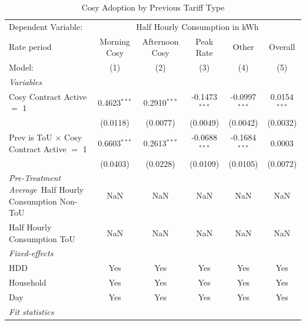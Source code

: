 
\begin{table}[htbp]
   \caption{\label{tab:prevrav} Cosy Adoption by Previous Tariff Type}
   \centering
   \begin{tabular}{lccccc}
      \tabularnewline \midrule \midrule
      Dependent Variable: & \multicolumn{5}{c}{Half Hourly Consumption in kWh}\\
      Rate period                                      & Morning Cosy   & Afternoon Cosy & Peak Rate       & Other           & Overall \\   
      Model:                                           & (1)            & (2)            & (3)             & (4)             & (5)\\  
      \midrule
      \emph{Variables}\\
      Cosy Contract Active $=$ 1                       & 0.4623$^{***}$ & 0.2910$^{***}$ & -0.1473$^{***}$ & -0.0997$^{***}$ & 0.0154$^{***}$\\   
                                                       & (0.0118)       & (0.0077)       & (0.0049)        & (0.0042)        & (0.0032)\\   
      Prev is ToU $\times$ Cosy Contract Active $=$ 1  & 0.6603$^{***}$ & 0.2613$^{***}$ & -0.0688$^{***}$ & -0.1684$^{***}$ & 0.0003\\   
                                                       & (0.0403)       & (0.0228)       & (0.0109)        & (0.0105)        & (0.0072)\\   
      \midrule
\emph{Pre-Treatment Average}\
      Half Hourly Consumption Non-ToU                  & NaN            & NaN            & NaN             & NaN             & NaN\\  
      Half Hourly Consumption ToU                      & NaN            & NaN            & NaN             & NaN             & NaN\\  
\midrule
      \emph{Fixed-effects}\\
      HDD                                              & Yes            & Yes            & Yes             & Yes             & Yes\\  
      Household                                        & Yes            & Yes            & Yes             & Yes             & Yes\\  
      Day                                              & Yes            & Yes            & Yes             & Yes             & Yes\\  
      \midrule
      \emph{Fit statistics}\\

\end{tabular}
\end{table}
